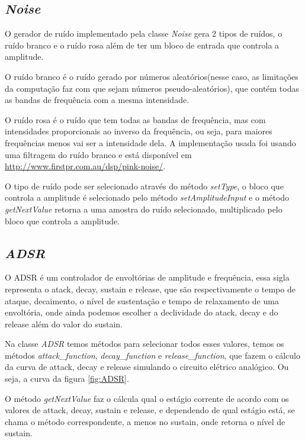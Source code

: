 \documentclass{article}
\begin{document}
\subsection{\emph{Noise}}
O gerador de ruído implementado pela classe \emph{Noise} gera 2 tipos de ruídos, o ruído branco e o ruído rosa além de ter um bloco de entrada que controla a amplitude.


O ruído branco é o ruído gerado por números aleatórios(nesse caso, as limitações da computação faz com que sejam números pseudo-aleatórios),
 que contém todas as bandas de frequência com a mesma intensidade.



O ruído rosa é o ruído que tem todas as bandas de frequência, mas com intensidades proporcionais ao inverso da frequência, ou seja, para maiores
 frequências menos vai ser a intensidade dela. A implementação usada foi usando uma filtragem do ruído branco e está disponível em \url{http://www.firstpr.com.au/dsp/pink-noise/}.


O tipo de ruído pode ser selecionado através do método \emph{setType}, o bloco que controla a amplitude é selecionado pelo método \emph{setAmplitudeInput}
e o método \emph{getNextValue} retorna a uma amostra do ruído selecionado, multiplicado pelo bloco que controla a amplitude.

\subsection{\emph{ADSR}}
O ADSR é um controlador de envoltórias de amplitude e frequência, essa sigla representa o atack, decay, sustain e release, que são 
respectivamente o tempo de ataque, decaimento, o nível de sustentação e tempo de relaxamento de uma envoltória, onde ainda podemos 
escolher a declividade do atack, decay e do release além do valor do sustain.



Na classe \emph{ADSR} temos métodos para selecionar todos esses valores, temos os métodos \emph{attack\_function}, \emph{decay\_function}
 e \emph{release\_function}, que fazem o cálculo da curva de attack, decay e release simulando o circuito elétrico analógico. Ou seja, a curva da figura \ref{fig:ADSR}.



O método \emph{getNextValue} faz o cálcula qual o estágio corrente de acordo com os valores de attack, decay, sustain e release, e dependendo de 
qual estágio está, se chama o método correspondente, a menos no sustain, onde retorna o nível de sustain.
\end{document}
